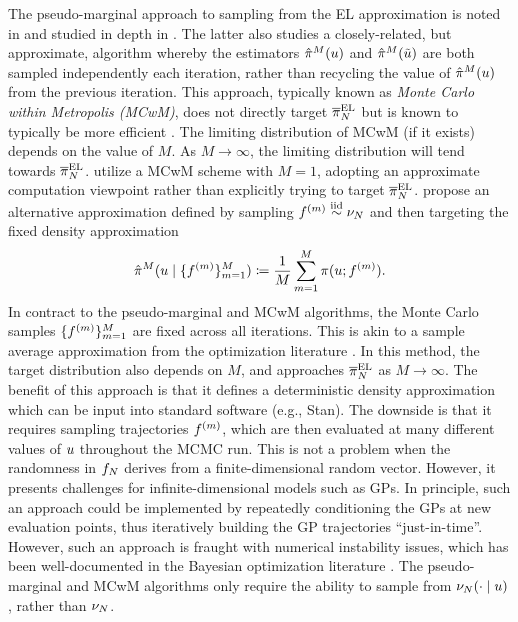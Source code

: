 \documentclass[12pt]{article}
\begin{document}
The pseudo-marginal approach to sampling from the EL approximation is noted in \citep{StuartTeck1} and studied 
in depth in \citep{garegnani2021NoisyMCMC}. The latter also studies a closely-related, but approximate, algorithm
whereby the estimators $\hat{\pi}^M(u)$ and $\hat{\pi}^M(\tilde{u})$ are both sampled independently
each iteration, rather than recycling the value of $\hat{\pi}^M(u)$ from the previous iteration. This approach, 
typically known as \textit{Monte Carlo within Metropolis (MCwM)}, does not directly target $\overline{\pi}_{N}^{\mathrm{EL}}$
but is known to typically be more efficient \citep{noisyMCMC,stabilityNoisyMH,noisyMCSurvey}.
The limiting distribution of MCwM (if it exists) depends on the value of $M$. As $M \to \infty$, the limiting distribution 
will tend towards $\overline{\pi}_{N}^{\mathrm{EL}}$. \citet{FerEmulation} utilize a MCwM scheme with $M = 1$, adopting an
approximate computation viewpoint rather than explicitly trying to target $\overline{\pi}_{N}^{\mathrm{EL}}$.
\citet{BurknerSurrogate} propose an alternative approximation defined by sampling 
$f^{(m)} \overset{\mathrm{iid}}{\sim} \nu_{N}$ and then targeting the fixed density approximation
\begin{align}
\hat{\pi}^M(u \mid \{f^{(m)}\}_{m=1}^{M}) \coloneqq 
\frac{1}{M} \sum_{m=1}^{M} \pi(u; f^{(m)}).
\end{align}
In contract to the pseudo-marginal and MCwM algorithms, the Monte Carlo samples $\{f^{(m)}\}_{m=1}^{M}$
are fixed across all iterations. This is akin to a sample average approximation from the optimization literature
\citep{SAA}. In this method, the target distribution also depends on $M$, and approaches $\overline{\pi}_{N}^{\mathrm{EL}}$
as $M \to \infty$. The benefit of this approach is that it defines a deterministic density approximation which can be input
into standard software (e.g., Stan). The downside is that it requires sampling trajectories $f^{(m)}$, which are 
then evaluated at many different values of $u$ throughout the MCMC run. This is not a problem when the randomness
in $f_{N}$ derives from a finite-dimensional random vector. However, it presents challenges for infinite-dimensional models
such as GPs. In principle, such an approach could be implemented by repeatedly conditioning the GPs at new evaluation points,
thus iteratively building the GP trajectories ``just-in-time''. However, such an approach is fraught with numerical instability issues,
which has been well-documented in the Bayesian optimization literature \citep{pathwiseConditioning}. 
The pseudo-marginal and MCwM algorithms only require the ability to sample from $\nu_{N}(\cdot \mid u)$, 
rather than $\nu_{N}$.
\end{document}
